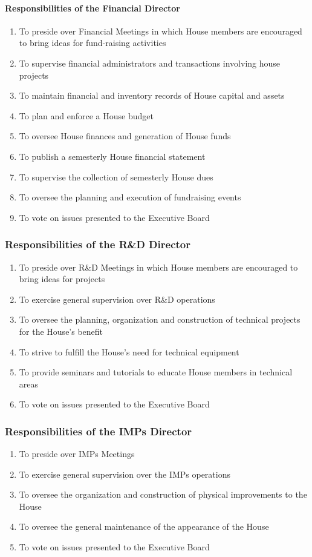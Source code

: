 \documentclass{article}
\newcommand{\asubsection}[1]{\subsubsection{#1} \label{#1}}
\newcommand{\asubsubsection}[1]{\paragraph{#1} \label{#1}}
\begin{document}
\asubsubsection{Responsibilities of the Financial Director}
\begin{enumerate}
	\item To preside over Financial Meetings in which House members are encouraged to bring ideas for fund-raising activities
	\item To supervise financial administrators and transactions involving house projects
	\item To maintain financial and inventory records of House capital and assets
	\item To plan and enforce a House budget
	\item To oversee House finances and generation of House funds
	\item To publish a semesterly House financial statement
	\item To supervise the collection of semesterly House dues
	\item To oversee the planning and execution of fundraising events
	\item To vote on issues presented to the Executive Board
\end{enumerate}

\subsubsection{Responsibilities of the R\&D Director}
\begin{enumerate}
	\item To preside over R\&D Meetings in which House members are encouraged to bring ideas for projects
	\item To exercise general supervision over R\&D operations
	\item To oversee the planning, organization and construction of technical projects for the House's benefit
	\item To strive to fulfill the House's need for technical equipment
	\item To provide seminars and tutorials to educate House members in technical areas
	\item To vote on issues presented to the Executive Board
\end{enumerate}

\asubsection{Responsibilities of the IMPs Director}
\begin{enumerate}
	\item To preside over IMPs Meetings
	\item To exercise general supervision over the IMPs operations
	\item To oversee the organization and construction of physical improvements to the House
	\item To oversee the general maintenance of the appearance of the House
	\item To vote on issues presented to the Executive Board
\end{enumerate}
\end{document}
